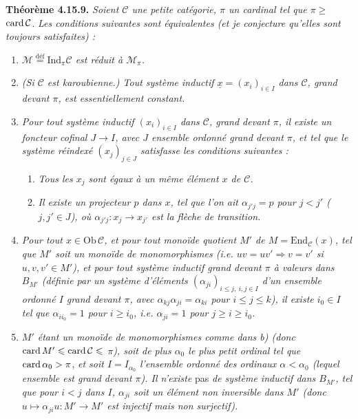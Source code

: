 \textbf{Théorème 4.15.9.} \textit{Soient $\mathcal{C}$ une petite catégorie, $\pi$ un cardinal tel que $\pi \geqslant$} $\operatorname{card}\mathcal{C}$. \textit{Les conditions suivantes sont équivalentes (et je conjecture qu'elles sont toujours satisfaites) :}
\begin{enumerate}[nosep]
\item[\textit{a)}] \textit{$\mathcal{M} \overset{\text{déf}}{=} \mathrm{Ind}_\pi\mathcal{C}$ est réduit à $\mathcal{M}_\pi$.}
\item[\textit{a$'$)}] \textit{(Si $\mathcal{C}$ est karoubienne.) Tout système inductif $\underline{x} = (x_i)_{i\in I}$ dans $\mathcal{C}$, grand devant $\pi$, est essentiellement constant.}
\item[\textit{a$''$)}] \textit{Pour tout système inductif $(x_i)_{i\in I}$ dans $\mathcal{C}$, grand devant $\pi$, il existe un foncteur cofinal $J \longrightarrow I$, avec $J$ ensemble ordonné grand devant $\pi$, et tel que le système réindexé $(x_j)_{j\in J}$ satisfasse les conditions suivantes :}
\begin{enumerate}[nosep]
\item[\textit{1)}] \textit{Tous les $x_j$ sont égaux à un même élément $x$ de $\mathcal{C}$.}
\item[\textit{2)}] \textit{Il existe un projecteur $p$ dans $x$, tel que l'on ait $\alpha_{j'j} = p$ pour $j < j'$ ($j,j' \in J$), où $\alpha_{j'j} : x_j \longrightarrow x_{j'}$ est la flèche de transition.}
\end{enumerate}
\item[\textit{b)}] \textit{Pour tout $x \in \mathrm{Ob}\,\mathcal{C}$, et pour tout monoïde quotient $M'$ de $M = \mathrm{End}_{\mathcal{C}}(x)$, tel que $M'$ soit un monoïde de monomorphismes (i.e. $uv = uv' \Longrightarrow v = v'$ si $u,v,v' \in M'$), et pour tout système inductif grand devant $\pi$ à valeurs dans $B_{M'}$ (définie par un système d'éléments $(\alpha_{ji})_{i\leqslant j,\ i,j\in I}$ d'un ensemble ordonné $I$ grand devant $\pi$, avec $\alpha_{kj}\alpha_{ji} = \alpha_{ki}$ pour $i \leqslant j \leqslant k$), il existe $i_0 \in I$ tel}
\textit{que $\alpha_{ii_0} = 1$ pour $i \geqslant i_0$, i.e. $\alpha_{ji} = 1$ pour $j \geqslant i \geqslant i_0$.}
\item[\textit{b$'$)}] \textit{$M'$ étant un monoïde de monomorphismes comme dans b) (donc} $\operatorname{card} M' \leqslant \operatorname{card}\mathcal{C} \leqslant$ \textit{$\pi$), soit de plus $\alpha_0$ le plus petit ordinal tel que} $\operatorname{card}\alpha_0 > \pi$, \textit{et soit $I = I_{\alpha_0}$ l'ensemble ordonné des ordinaux $\alpha < \alpha_0$ (lequel ensemble est grand devant $\pi$). Il n'existe} pas \textit{de système inductif dans $B_{M'}$, tel que pour $i < j$ dans $I$, $\alpha_{ji}$ soit un élément non inversible dans $M'$ (donc $u \longmapsto \alpha_{ji}u : M' \longrightarrow M'$ est injectif mais non surjectif).}
\end{enumerate}


